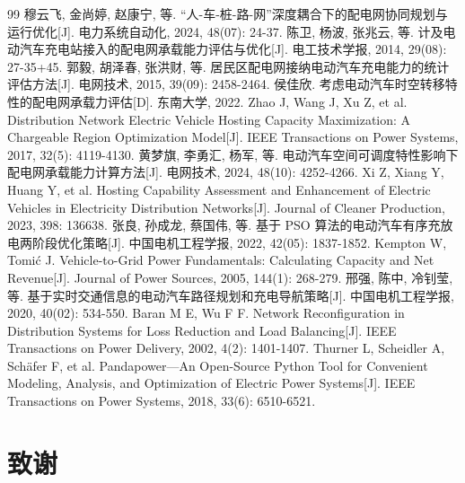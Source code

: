 \documentclass[10pt,a4paper]{article}
\numberwithin{equation}{section}
\numberwithin{table}{section}
\numberwithin{figure}{section}
\begin{document}
\begin{thebibliography}{99}
         穆云飞, 金尚婷, 赵康宁, 等. “人-车-桩-路-网”深度耦合下的配电网协同规划与运行优化[J]. 电力系统自动化, 2024, 48(07): 24-37.
         陈卫, 杨波, 张兆云, 等. 计及电动汽车充电站接入的配电网承载能力评估与优化[J]. 电工技术学报, 2014, 29(08): 27-35+45.
         郭毅, 胡泽春, 张洪财, 等. 居民区配电网接纳电动汽车充电能力的统计评估方法[J]. 电网技术, 2015, 39(09): 2458-2464.
         侯佳欣. 考虑电动汽车时空转移特性的配电网承载力评估[D]. 东南大学, 2022.
         Zhao J, Wang J, Xu Z, et al. Distribution Network Electric Vehicle Hosting Capacity Maximization: A Chargeable Region Optimization Model[J]. IEEE Transactions on Power Systems, 2017, 32(5): 4119-4130.
         黄梦旗, 李勇汇, 杨军, 等. 电动汽车空间可调度特性影响下配电网承载能力计算方法[J]. 电网技术, 2024, 48(10): 4252-4266.
         Xi Z, Xiang Y, Huang Y, et al. Hosting Capability Assessment and Enhancement of Electric Vehicles in Electricity Distribution Networks[J]. Journal of Cleaner Production, 2023, 398: 136638.
         张良, 孙成龙, 蔡国伟, 等. 基于 PSO 算法的电动汽车有序充放电两阶段优化策略[J]. 中国电机工程学报, 2022, 42(05): 1837-1852.
         Kempton W, Tomi\'c J. Vehicle-to-Grid Power Fundamentals: Calculating Capacity and Net Revenue[J]. Journal of Power Sources, 2005, 144(1): 268-279.
         邢强, 陈中, 冷钊莹, 等. 基于实时交通信息的电动汽车路径规划和充电导航策略[J]. 中国电机工程学报, 2020, 40(02): 534-550.
         Baran M E, Wu F F. Network Reconfiguration in Distribution Systems for Loss Reduction and Load Balancing[J]. IEEE Transactions on Power Delivery, 2002, 4(2): 1401-1407.
         Thurner L, Scheidler A, Sch\"afer F, et al. Pandapower---An Open-Source Python Tool for Convenient Modeling, Analysis, and Optimization of Electric Power Systems[J]. IEEE Transactions on Power Systems, 2018, 33(6): 6510-6521.
    \end{thebibliography}

    \endgroup

    \newpage
    \section*{致谢}
\end{document}
